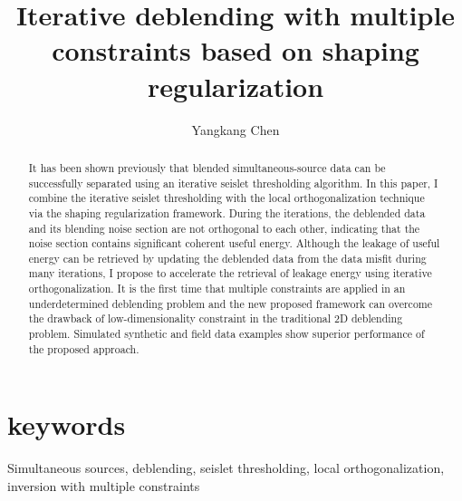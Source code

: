 
\title{Iterative deblending with multiple constraints based on shaping regularization}
\author{Yangkang Chen}
\address{
Bureau of Economic Geology \\
John A. and Katherine G. Jackson School of Geosciences \\
The University of Texas at Austin \\
University Station, Box X \\
Austin, TX 78713-8924 \\
}

\maketitle

\begin{abstract}
It has been shown previously that blended simultaneous-source data can be successfully separated using an iterative seislet thresholding algorithm. In this paper, I combine the iterative seislet thresholding with the local orthogonalization technique via the shaping regularization framework. During the iterations, the deblended data and its blending noise section are not orthogonal to each other, indicating that the noise section contains significant coherent useful energy. Although the leakage of useful energy can be retrieved by updating the deblended data from the data misfit during many iterations, I propose to accelerate the retrieval of leakage energy using iterative orthogonalization. It is the first time that multiple constraints are applied in an underdetermined deblending problem and the new proposed framework can overcome the drawback of low-dimensionality constraint in the traditional 2D deblending problem. Simulated synthetic and field data examples show superior performance of the proposed approach.
\end{abstract}

\section{keywords}
Simultaneous sources, deblending, seislet thresholding, local orthogonalization, inversion with multiple constraints

